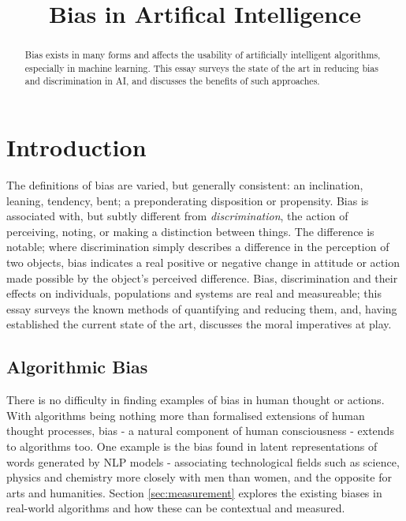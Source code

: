 \documentclass[conference]{IEEEtran}
\begin{document}
\title{Bias in Artifical Intelligence}
\author{
}
\maketitle
\begin{abstract}
    Bias exists in many forms and affects the usability of artificially intelligent algorithms, especially in machine learning. This essay surveys the state of the art in reducing bias and discrimination in AI, and discusses the benefits of such approaches.
\end{abstract}
\section{Introduction}
The definitions of bias are varied, but generally consistent: an inclination, leaning, tendency, bent; a preponderating disposition or propensity\cite{Bias}. Bias is associated with, but subtly different from \emph{discrimination}, the action of perceiving, noting, or making a distinction between things\cite{Discrimination}. The difference is notable; where discrimination simply describes a difference in the perception of two objects, bias indicates a real positive or negative change in attitude or action made possible by the object's perceived difference. Bias, discrimination and their effects on individuals, populations and systems are real and measureable; this essay surveys the known methods of quantifying and reducing them, and, having established the current state of the art, discusses the moral imperatives at play.
\subsection{Algorithmic Bias}
There is no difficulty in finding examples of bias in human thought\cite{FitzGerald2019} or actions\cite{NBERw22014}. With algorithms being nothing more than formalised extensions of human thought processes, bias - a natural component of human consciousness - extends to algorithms too. One example is the bias found in latent representations of words generated by NLP models\cite{pmlr-v97-brunet19a} - associating technological fields such as science, physics and chemistry more closely with men than women, and the opposite for arts and humanities. Section \ref{sec:measurement} explores the existing biases in real-world algorithms and how these can be contextual and measured.
\end{document}
